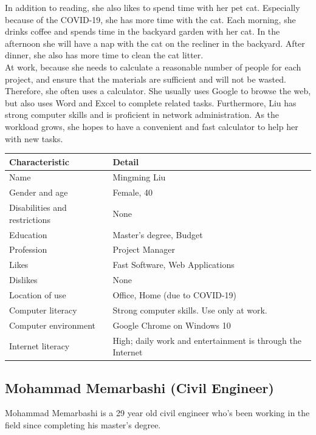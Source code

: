 \documentclass[11pt,onside]{report}
\begin{document}
In addition to reading, she also likes to spend time with her pet cat. Especially because of the COVID-19, she has more time with the cat. Each morning, she drinks coffee and spends time in the backyard garden with her cat. In the afternoon she will have a nap with the cat on the recliner in the backyard. After dinner, she also has more time to clean the cat litter. \\

At work, because she needs to calculate a reasonable number of people for each project, and ensure that the materials are sufficient and will not be wasted. Therefore, she often uses a calculator. She usually uses Google to browse the web, but also uses Word and Excel to complete related tasks. Furthermore, Liu has strong computer skills and is proficient in network administration. As the workload grows, she hopes to have a convenient and fast calculator to help her with new tasks.
\begin{center}
    \begin{tabular}{|p{4cm}|p{10cm}|}
        \hline
        \bf{Characteristic} & \bf{Detail} \\
        \hline
        Name &   Mingming Liu \\
        \hline
        Gender and age & Female, 40 \\
        \hline
        Disabilities and restrictions &  None \\
        \hline
        Education & Master's degree, Budget \\
        \hline
        Profession & Project Manager \\
        \hline
        Likes & Fast Software, Web Applications \\
        \hline
        Dislikes & None \\
        \hline
        Location of use & Office, Home (due to COVID-19) \\
        \hline
        Computer literacy &  Strong computer skills. Use only at work. \\
        \hline
        Computer environment &  Google Chrome on Windows 10 \\
        \hline
        Internet literacy &  High; daily work and entertainment is through the Internet \\
        \hline
    \end{tabular}
\end{center}

\subsection{Mohammad Memarbashi (Civil Engineer)}
Mohammad Memarbashi is a 29 year old civil engineer who’s been working in the field since completing his master’s degree. \\
\end{document}
